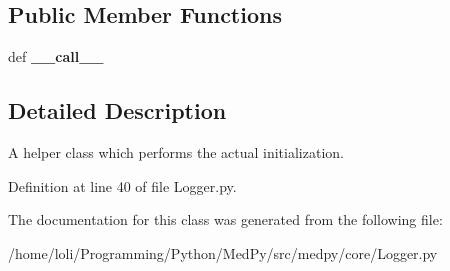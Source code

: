 \subsection*{Public Member Functions}
\begin{DoxyCompactItemize}
\item 
\hypertarget{classmedpy_1_1core_1_1Logger_1_1Logger_1_1LoggerHelper_aea5d63b929cd6340bc6f8f249956e44b}{
def {\bfseries \_\-\_\-call\_\-\_\-}}
\label{classmedpy_1_1core_1_1Logger_1_1Logger_1_1LoggerHelper_aea5d63b929cd6340bc6f8f249956e44b}

\end{DoxyCompactItemize}


\subsection{Detailed Description}
A helper class which performs the actual initialization. 

Definition at line 40 of file Logger.py.



The documentation for this class was generated from the following file:\begin{DoxyCompactItemize}
\item 
/home/loli/Programming/Python/MedPy/src/medpy/core/Logger.py\end{DoxyCompactItemize}
